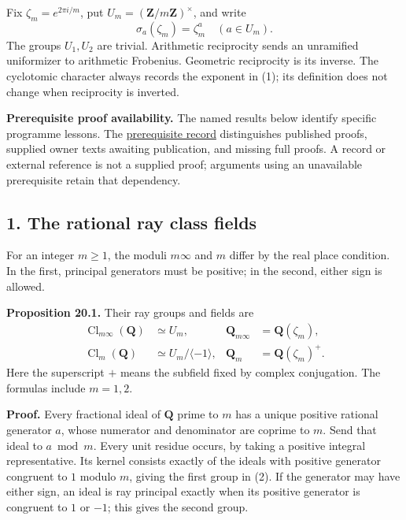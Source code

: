 \documentclass[11pt,a4paper]{article}
\begin{document}
Fix \(\zeta_m=e^{2\pi i/m}\), put \(U_m=(\mathbf Z/m\mathbf Z)^\times\),
and write \[
\sigma_a(\zeta_m)=\zeta_m^a\quad(a\in U_m).
\tag{1}
\] The groups \(U_1,U_2\) are trivial. Arithmetic reciprocity sends an
unramified uniformizer to arithmetic Frobenius. Geometric reciprocity is
its inverse. The cyclotomic character always records the exponent in
(1); its definition does not change when reciprocity is inverted.

\textbf{Prerequisite proof availability.} The named results below
identify specific programme lessons. The
\href{https://kokunoyumeto.github.io/open-math-courses/courses/NT-CFT/proof-dependencies.html\#lesson-20}{prerequisite
record} distinguishes published proofs, supplied owner texts awaiting
publication, and missing full proofs. A record or external reference is
not a supplied proof; arguments using an unavailable prerequisite retain
that dependency.

\subsection{1. The rational ray class
fields}\label{the-rational-ray-class-fields}

For an integer \(m\geq1\), the moduli \(m\infty\) and \(m\) differ by
the real place condition. In the first, principal generators must be
positive; in the second, either sign is allowed.

\textbf{Proposition 20.1.} Their ray groups and fields are \[
\begin{aligned}
\operatorname{Cl}_{m\infty}(\mathbf Q)&\simeq U_m,&
\mathbf Q_{m\infty}&=\mathbf Q(\zeta_m),\\
\operatorname{Cl}_{m}(\mathbf Q)&\simeq U_m/\langle-1\rangle,&
\mathbf Q_m&=\mathbf Q(\zeta_m)^+.
\end{aligned}
\tag{2}
\] Here the superscript \(+\) means the subfield fixed by complex
conjugation. The formulas include \(m=1,2\).

\textbf{Proof.} Every fractional ideal of \(\mathbf Q\) prime to \(m\)
has a unique positive rational generator \(a\), whose numerator and
denominator are coprime to \(m\). Send that ideal to \(a\bmod m\). Every
unit residue occurs, by taking a positive integral representative. Its
kernel consists exactly of the ideals with positive generator congruent
to \(1\) modulo \(m\), giving the first group in (2). If the generator
may have either sign, an ideal is ray principal exactly when its
positive generator is congruent to \(1\) or \(-1\); this gives the
second group.
\end{document}
